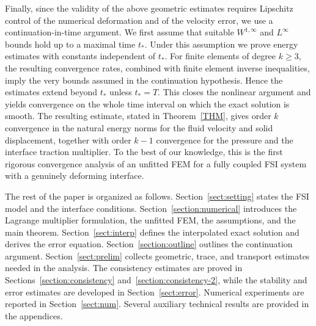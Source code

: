 \documentclass[11pt,reqno]{amsart}
\theoremstyle{definition}
\theoremstyle{plain}
\numberwithin{theorem}{section}
\numberwithin{proposition}{section}
\numberwithin{lemma}{section}
\numberwithin{equation}{section}
\renewcommand{\(}{\bigl(}
\renewcommand{\)}{\bigr)}
\begin{document}
Finally, since the validity of the above geometric estimates requires Lipschitz control of
the numerical deformation and of the velocity error, we use a continuation-in-time
argument. We first assume that suitable $W^{1,\infty}$ and $L^\infty$ bounds hold up to a
maximal time $t_*$. Under this assumption we prove energy estimates with constants
independent of $t_*$. For finite elements of degree $k\geq 3$, the resulting convergence
rates, combined with finite element inverse inequalities, imply the very bounds assumed
in the continuation hypothesis. Hence the estimates extend beyond $t_*$ unless
$t_*=T$. This closes the nonlinear argument and yields convergence on the whole time
interval on which the exact solution is smooth.
The resulting estimate, stated in Theorem~\ref{THM}, gives order $k$ convergence in the
natural energy norms for the fluid velocity and solid displacement, together with order $k-1$ convergence for the pressure and the interface traction multiplier. To the
best of our knowledge, this is the first rigorous convergence analysis of an unfitted FEM for a fully coupled FSI system with a genuinely deforming interface.

The rest of the paper is organized as follows. Section~\ref{sect:setting} states the FSI
model and the interface conditions. Section~\ref{section:numerical} introduces the
Lagrange multiplier formulation, the unfitted FEM, the assumptions, and
the main theorem. Section~\ref{sect:interp} defines the interpolated exact solution and
derives the error equation. Section~\ref{section:outline} outlines the
continuation argument. Section~\ref{sect:prelim} collects geometric, trace, and
transport estimates needed in the analysis. The consistency estimates are proved in
Sections~\ref{section:consistency} and~\ref{section:consistency-2}, while the stability
and error estimates are developed in Section~\ref{sect:error}. Numerical experiments are
reported in Section~\ref{sect:num}. Several auxiliary technical results are provided in the
appendices.
\end{document}
